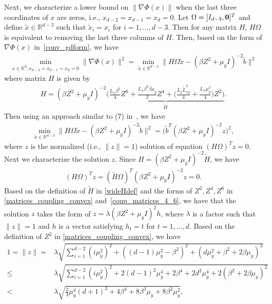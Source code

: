 \documentclass{osudissert96}
\begin{document}
\vspace{0.2cm}
\vspace{0.2cm}

Next, we characterize a lower bound on $\|\nabla \Phi(x)\|$ when the last three coordinates of $x$ are zeros, i.e., $x_{d-2}=x_{d-1}=x_d=0$. Let $\Omega = [I_{d-3}, {\bf 0}]^T$ and define $\widetilde x\in\mathbb{R}^{d-3}$ such that $\widetilde x_i=x_i$ for $i=1,...,d-3$. Then for any matrix $H$, $H\Omega$ is equivalent to removing the last three columns of $H$. Then,  based on the form of $\nabla \Phi(x)$ in~\cref{conv_gdform}, we have 
\begin{align}\label{eq:gdnorm1}
\min_{x\in\mathbb{R}^d: x_{d-2}=x_{d-1}=x_d=0} \|\nabla\Phi(x)\|^2 = \min_{\widetilde x\in\mathbb{R}^{d-3}} \|H\Omega \widetilde x -  (\beta Z^2 +\mu_y I)^{-2}\widetilde b\|^2
\end{align}
where matrix $H$ is given by 
\begin{align}\label{wideHdef}
H =  (\beta Z^2 +\mu_y I)^{-2}\underbrace{\Big (\frac{L_x\beta^2}{4} Z^6 +  \frac{L_x\beta^2\beta\mu_y}{2} Z^4 +\Big (\frac{L_y\widetilde L_{xy}^2}{4}+\frac{L_x\mu_y^2}{4}\Big) Z^2 \Big)}_{\widetilde H}.
\end{align}
Then using an approach similar to (7) in~\cite{carmon2019lower}, we have 
\begin{align}\label{eq:gdnomr2s}
\min_{\widetilde x\in\mathbb{R}^{d-3}} \|H\Omega \widetilde x -  (\beta Z^2 +\mu_y I)^{-2}\widetilde b\|^2 = \big(\widetilde b^T (\beta Z^2 +\mu_y I)^{-2} z\big)^2,
\end{align}
where $z$ is the normalized (i.e., $\|z\|=1$) solution of equation $(H\Omega)^Tz=0$. Next we characterize the solution $z$. Since $H=(\beta Z^2 +\mu_y I)^{-2}\widetilde H$, we have  
\begin{align}
(H\Omega)^Tz = (\widetilde H \Omega)^T(\beta Z^2 +\mu_y I)^{-2} z = 0.
\end{align}
Based on the definition of $\widetilde H $ in \cref{wideHdef} and the forms of $Z^2,Z^4,Z^6$ in \cref{matrices_coupling_convex} and~\cref{coup_matrices_4_6}, we have that the solution $z$ takes the form of $ z= \lambda (\beta Z^2 +\mu_y I)^{2}h$, where $\lambda$ is a factor such that $\|z\|=1$ and $h$ is a vector satisfying $h_t = t$ for $t=1,...,d$. Based on the definition of $Z^2$ in \cref{matrices_coupling_convex}, we have
\begin{align*}
1= \|z\| =& \lambda \sqrt{\sum_{i=1}^{d-2}(i\mu_y^2)^2 + ((d-1)\mu_y^2-\beta^2)^2 + (d\mu_y^2 +\beta^2+2\beta\mu_y)^2} \nonumber
\\\leq & \lambda \sqrt{\sum_{i=1}^{d-2}(i\mu_y^2)^2 + 2(d-1)^2\mu_y^4+2\beta^4 + 2d^2\mu_y^4 +2(\beta^2+2\beta\mu_y)^2} \nonumber
\\<& \lambda\sqrt{\frac{2}{3}\mu_y^4(d+1)^3 +4\beta^4+8\beta^3\mu_y+8\beta^2\mu_y^2},
\end{align*}
\end{document}
